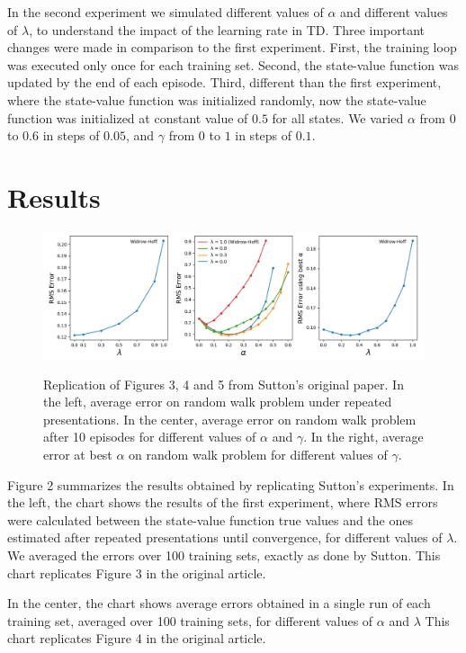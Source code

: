 \documentclass{article}
\begin{document}
In the second experiment we simulated different values of $\alpha$ and different values of $\lambda$, to understand the impact of the learning rate in TD.
Three important changes were made in comparison to the first experiment.
First, the training loop was executed only once for each training set.
Second, the state-value function was updated by the end of each episode.
Third, different than the first experiment, where the state-value function was initialized randomly, now the state-value function was initialized at constant value of $0.5$ for all states.
We varied $\alpha$ from $0$ to $0.6$ in steps of $0.05$, and $\gamma$ from $0$
 to $1$ in steps of $0.1$.


\section{Results}
\label{sec:results}

\begin{figure}[t]
    \includegraphics[width=\textwidth]{./images/figure.png}
    \centering
    \label{fig:fig2}
    \caption{Replication of Figures 3, 4 and 5 from Sutton's original paper.
    In the left, average error on random walk problem under repeated presentations.
    In the center, average error on random walk problem after 10 episodes for different values of $\alpha$ and $\gamma$.
    In the right, average error at best $\alpha$ on random walk problem for different values of $\gamma$.}
\end{figure}

Figure 2 summarizes the results obtained by replicating Sutton's experiments.
In the left, the chart shows the results of the first experiment, where RMS errors were calculated between the state-value function true values and the ones estimated after repeated presentations until convergence, for different values of $\lambda$.
We averaged the errors over 100 training sets, exactly as done by Sutton.
This chart replicates Figure 3 in the original article.

In the center, the chart shows average errors obtained in a single run of each training set, averaged over 100 training sets, for different values of $\alpha$ and $\lambda$
This chart replicates Figure 4 in the original article.
\end{document}
